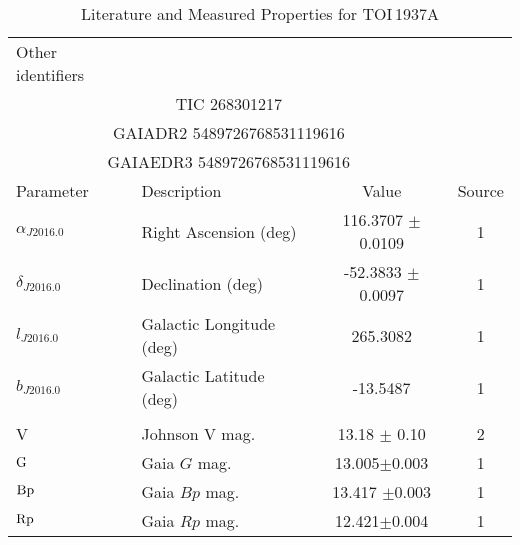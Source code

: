 \begin{table*}
\scriptsize
\setlength{\tabcolsep}{2pt}
\centering
\caption{Literature and Measured Properties for TOI$\,$1937A}
\label{tab:starparams}
\begin{tabular}{llcc}
  \hline
  \hline
Other identifiers\dotfill & \\
\multicolumn{3}{c}{TIC 268301217} \\
\multicolumn{3}{c}{GAIADR2 5489726768531119616} \\
\multicolumn{3}{c}{GAIAEDR3 5489726768531119616} \\
\hline
\hline
Parameter & Description & Value & Source\\
\hline 
$\alpha_{J2016.0}$\dotfill	&Right Ascension (deg)\dotfill & 116.3707 $\pm$ 0.0109& 1	\\
$\delta_{J2016.0}$\dotfill	&Declination (deg)\dotfill & -52.3833 $\pm$ 0.0097  & 1	\\
$l_{J2016.0}$\dotfill	&Galactic Longitude (deg)\dotfill & 265.3082 & 1	\\
$b_{J2016.0}$\dotfill	&Galactic Latitude (deg)\dotfill & -13.5487 & 1	\\
\\
V\dotfill			&Johnson V mag.\dotfill & 13.18 $\pm$ 0.10		& 2	\\
${\rm G}$\dotfill     & Gaia $G$ mag.\dotfill     & 13.005$\pm$0.003 & 1\\
${\rm Bp}$\dotfill     & Gaia $Bp$ mag.\dotfill     & 13.417 $\pm$0.003 & 1\\
${\rm Rp}$\dotfill     & Gaia $Rp$ mag.\dotfill     & 12.421$\pm$0.004 & 1\\

\end{tabular}
\end{table*}

